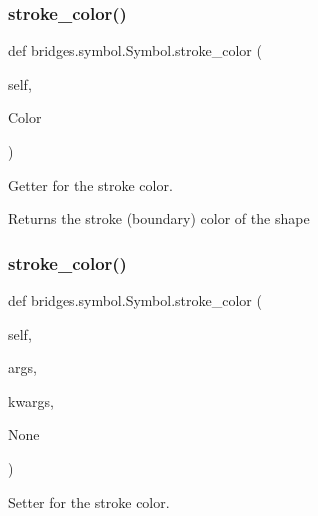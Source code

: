 \mbox{\label{classbridges_1_1symbol_1_1_symbol_ab7aef566eaf9624f6adc0ae1d5768b5b}} 
\subsubsection{\texorpdfstring{stroke\+\_\+color()}{stroke\_color()}\hspace{0.1cm}{\footnotesize\ttfamily [1/2]}}
{\footnotesize\ttfamily def bridges.\+symbol.\+Symbol.\+stroke\+\_\+color (\begin{DoxyParamCaption}\item[{}]{self,  }\item[{}]{Color }\end{DoxyParamCaption})}



Getter for the stroke color. 

\begin{DoxyReturn}{Returns}
the stroke (boundary) color of the shape 
\end{DoxyReturn}
\mbox{\label{classbridges_1_1symbol_1_1_symbol_a4b90f8a3ebbf1bd8586d970e796a2401}} 
\subsubsection{\texorpdfstring{stroke\+\_\+color()}{stroke\_color()}\hspace{0.1cm}{\footnotesize\ttfamily [2/2]}}
{\footnotesize\ttfamily def bridges.\+symbol.\+Symbol.\+stroke\+\_\+color (\begin{DoxyParamCaption}\item[{}]{self,  }\item[{}]{args,  }\item[{}]{kwargs,  }\item[{}]{None }\end{DoxyParamCaption})}



Setter for the stroke color. 


